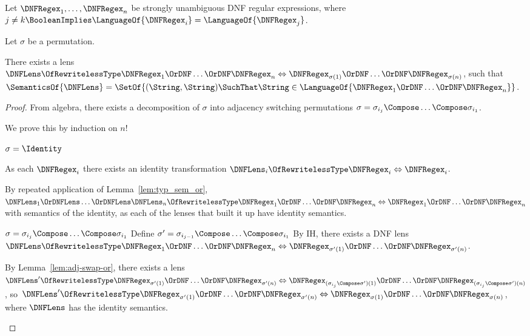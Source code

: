 \documentclass[acmsmall,screen]{acmart}
\begin{document}
\begin{mylemma}
  \label{lem:perm-or}
  Let $\DNFRegex_1,\ldots,\DNFRegex_n$ be strongly unambiguous DNF regular
  expressions, where $j \neq k \BooleanImplies
  \LanguageOf{\DNFRegex_i} = \LanguageOf{\DNFRegex_j}$.

  Let $\sigma$ be a permutation.

  There exists a lens $\DNFLens \OfRewritelessType \DNFRegex_1 \OrDNF \ldots
  \OrDNF \DNFRegex_n \Leftrightarrow \DNFRegex_{\sigma(1)} \OrDNF \ldots
  \OrDNF \DNFRegex_{\sigma(n)}$, such that $\SemanticsOf{\DNFLens} =
  \SetOf{(\String,\String) \SuchThat \String \in \LanguageOf{\DNFRegex_1 \OrDNF
      \ldots \OrDNF \DNFRegex_n}}$.
\end{mylemma}
\begin{proof}
  From algebra, there exists a decomposition of $\sigma$ into adjacency
  switching permutations $\sigma = \sigma_{i_j} \Compose \ldots \Compose
  \sigma_{i_1}$.

  We prove this by induction on $n$!

  \begin{case}[$j=0$]
    $\sigma = \Identity$

    As each $\DNFRegex_i$ there exists an identity transformation
    $\DNFLens_i \OfRewritelessType \DNFRegex_i \Leftrightarrow \DNFRegex_i$.

    By repeated application of
    Lemma~\ref{lem:typ_sem_or},
    $\DNFLens_1 \OrDNFLens \ldots \OrDNFLens \DNFLens_n \OfRewritelessType
    \DNFRegex_1 \OrDNF \ldots \OrDNF \DNFRegex_n \Leftrightarrow
    \DNFRegex_1 \OrDNF \ldots \OrDNF \DNFRegex_n$ with semantics of the
    identity, as each of the lenses that built it up have identity semantics.
  \end{case}

  \begin{case}[$j>0$]
    $\sigma = \sigma_{i_j} \Compose \ldots \Compose \sigma_{i_1}$
    Define $\sigma' = \sigma_{i_{j-1}} \Compose \ldots \Compose \sigma_{i_1}$
    By IH, there exists a DNF lens
    $\DNFLens \OfRewritelessType
    \DNFRegex_1 \OrDNF \ldots \OrDNF \DNFRegex_n
    \Leftrightarrow
    \DNFRegex_{\sigma'(1)} \OrDNF \ldots \OrDNF \DNFRegex_{\sigma'(n)}$.

    By Lemma~\ref{lem:adj-swap-or}, there exists a lens
    $\DNFLens' \OfRewritelessType
    \DNFRegex_{\sigma'(1)} \OrDNF \ldots \OrDNF \DNFRegex_{\sigma'(n)}
    \Leftrightarrow
    \DNFRegex_{(\sigma_{i_j} \Compose \sigma')(1)} \OrDNF \ldots \OrDNF
    \DNFRegex_{(\sigma_{i_j} \Compose \sigma')(n)}$,
    so 
    $\DNFLens' \OfRewritelessType
    \DNFRegex_{\sigma'(1)} \OrDNF \ldots \OrDNF \DNFRegex_{\sigma'(n)}
    \Leftrightarrow
    \DNFRegex_{\sigma(1)} \OrDNF \ldots \OrDNF \DNFRegex_{\sigma(n)}$, where
    $\DNFLens$ has the identity semantics.


\end{case}
\end{proof}
\end{document}
